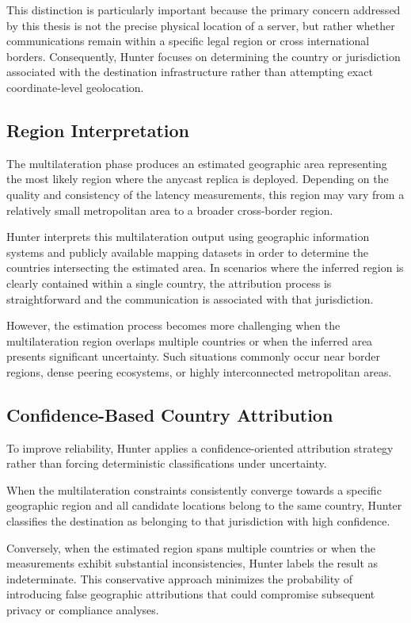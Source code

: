This distinction is particularly important because the primary concern addressed by this thesis is not the precise physical location of a server, but rather whether communications remain within a specific legal region or cross international borders. Consequently, Hunter focuses on determining the country or jurisdiction associated with the destination infrastructure rather than attempting exact coordinate-level geolocation.

\subsection{Region Interpretation}

The multilateration phase produces an estimated geographic area representing the most likely region where the anycast replica is deployed. Depending on the quality and consistency of the latency measurements, this region may vary from a relatively small metropolitan area to a broader cross-border region.

Hunter interprets this multilateration output using geographic information systems and publicly available mapping datasets in order to determine the countries intersecting the estimated area. In scenarios where the inferred region is clearly contained within a single country, the attribution process is straightforward and the communication is associated with that jurisdiction.

However, the estimation process becomes more challenging when the multilateration region overlaps multiple countries or when the inferred area presents significant uncertainty. Such situations commonly occur near border regions, dense peering ecosystems, or highly interconnected metropolitan areas.

\subsection{Confidence-Based Country Attribution}

To improve reliability, Hunter applies a confidence-oriented attribution strategy rather than forcing deterministic classifications under uncertainty.

When the multilateration constraints consistently converge towards a specific geographic region and all candidate locations belong to the same country, Hunter classifies the destination as belonging to that jurisdiction with high confidence.

Conversely, when the estimated region spans multiple countries or when the measurements exhibit substantial inconsistencies, Hunter labels the result as indeterminate. This conservative approach minimizes the probability of introducing false geographic attributions that could compromise subsequent privacy or compliance analyses.

